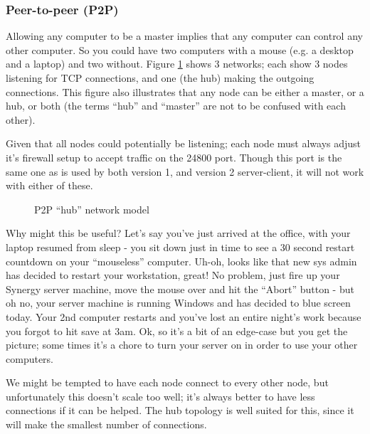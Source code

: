\subsubsection{Peer-to-peer (P2P)}


Allowing any computer to be a master implies that any computer can control
any other computer. So you could have two computers with a mouse (e.g. a 
desktop and a laptop) and two without. Figure \ref{fig:p2p} shows 3 networks;
each show 3 nodes listening for TCP connections, and one (the hub) making the
outgoing connections. This figure also illustrates that any node can be either
a master, or a hub, or both (the terms ``hub'' and ``master'' are not to be 
confused with each other).

Given that
all nodes could potentially be listening; each node must always adjust it's
firewall setup to accept traffic on the 24800 port. Though this port is the
same one as is used by both version 1, and version 2 server-client, it will
not work with either of these.

\begin{figure}[ht!]
  \centering
  
  \caption{P2P ``hub'' network model}
  \label{fig:p2p}
\end{figure}

Why might this be useful? Let's say you've just arrived at the
office, with your laptop resumed from sleep - you sit down just in time to see
a 30 second restart countdown on your ``mouseless'' computer. Uh-oh, looks like
that new sys admin has decided to restart your workstation, great! No problem, 
just fire up your Synergy server machine, move the mouse over and hit the 
``Abort'' button - but oh no, your server machine is running Windows and has 
decided to blue screen today. Your 2nd computer restarts and you've lost an 
entire night's work because you forgot to hit save at 3am. Ok, so it's a bit 
of an edge-case but you get the picture; some times it's a chore to turn your
server on in order to use your other computers.

We might be tempted to have each node connect to every other node, but
unfortunately this doesn't scale too well; it's always better to have less
connections if it can be helped. The hub topology is well suited for this,
since it will make the smallest number of connections.

